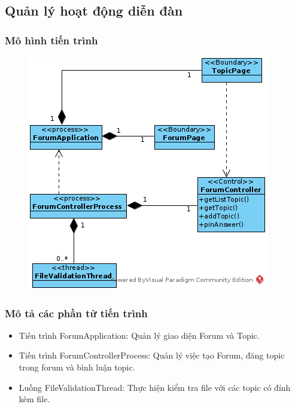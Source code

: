 \documentclass[./../main_file.tex]{subfiles}
\begin{document}
\subsection{Quản lý hoạt động diễn đàn}

\subsubsection{Mô hình tiến trình}

\begin{figure}[H]
	\centering
	\includegraphics[width=\linewidth]{./images/pv_manage_forum.png}
\end{figure}

\subsubsection{Mô tả các phần tử tiến trình}
\begin{itemize}
	\item Tiến trình ForumApplication: Quản lý giao diện Forum và Topic.
	\item Tiến trình ForumControllerProcess: Quản lý việc tạo Forum, đăng topic trong forum và bình luận topic.
	\item Luồng FileValidationThread: Thực hiện kiểm tra file với các topic có đính kèm file.
\end{itemize}
\end{document}
